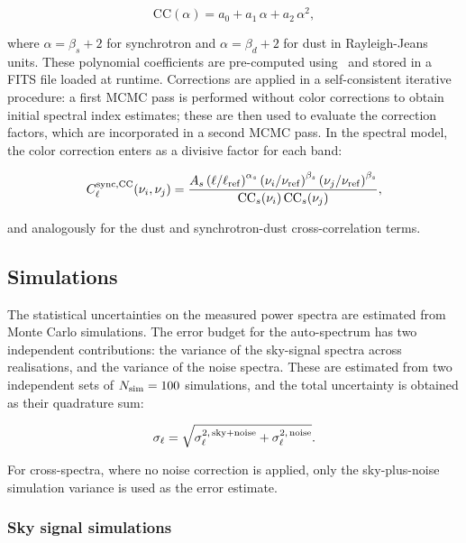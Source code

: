 \begin{equation}
    \mathrm{CC}(\alpha) = a_0 + a_1\, \alpha + a_2\, \alpha^2,
\end{equation}

where $\alpha = \beta_s + 2$ for synchrotron and $\alpha = \beta_d + 2$ for dust in Rayleigh-Jeans units. These polynomial coefficients are pre-computed using \fastcc\ and stored in a FITS file loaded at runtime. Corrections are applied in a self-consistent iterative procedure: a first MCMC pass is performed without color corrections to obtain initial spectral index estimates; these are then used to evaluate the correction factors, which are incorporated in a second MCMC pass. In the spectral model, the color correction enters as a divisive factor for each band:

\begin{equation}
    C_\ell^{\rm sync, CC}(\nu_i, \nu_j) = \frac{A_s \left(\ell/\ell_{\rm ref}\right)^{\alpha_s} \left(\nu_i/\nu_{\rm ref}\right)^{\beta_s} \left(\nu_j/\nu_{\rm ref}\right)^{\beta_s}}{\mathrm{CC}_s(\nu_i)\,\mathrm{CC}_s(\nu_j)},
\end{equation}

and analogously for the dust and synchrotron-dust cross-correlation terms.

\subsection{Simulations}
\label{sec:simulations}

The statistical uncertainties on the measured power spectra are estimated from Monte Carlo simulations. The error budget for the auto-spectrum has two independent contributions: the variance of the sky-signal spectra across realisations, and the variance of the noise spectra. These are estimated from two independent sets of $N_{\rm sim} = 100$ simulations, and the total uncertainty is obtained as their quadrature sum:

\begin{equation}
    \sigma_\ell = \sqrt{\sigma_\ell^{2,\,\rm sky+noise} + \sigma_\ell^{2,\,\rm noise}}.
\end{equation}

For cross-spectra, where no noise correction is applied, only the sky-plus-noise simulation variance is used as the error estimate.

\subsubsection{Sky signal simulations}
\label{sec:sky_simulations}

